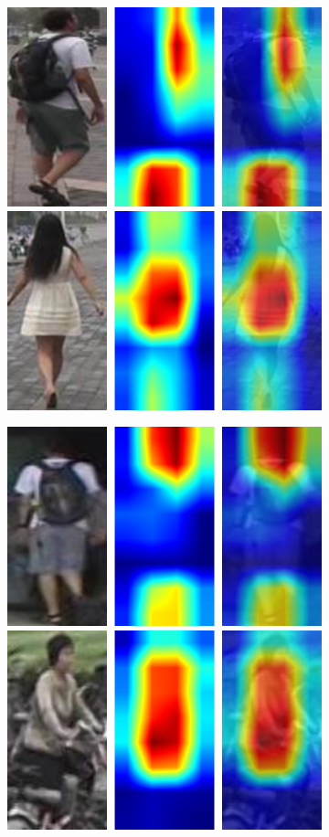 \begin{figure}
    \centering
    
    \begin{subfigure}[b]{0.98\textwidth}
        \centering
        \includegraphics[width=0.45\columnwidth]{5_unlearn/figs/scrub/0006_mlfn_rem1.jpg}
        \hspace{15pt}
        \includegraphics[width=0.45\columnwidth]{5_unlearn/figs/scrub/0001_mlfn_ret1.jpg}
    \end{subfigure}
    
    \vspace{10 pt}
    
    \begin{subfigure}[b]{0.98\textwidth}
        \centering
        \includegraphics[width=0.45\columnwidth]{5_unlearn/figs/scrub/0006_mlfn_rem2.jpg}
        \hspace{15pt}
        \includegraphics[width=0.45\columnwidth]{5_unlearn/figs/scrub/0029_mlfn_ret2.jpg}
    \end{subfigure}
    

\end{figure}
